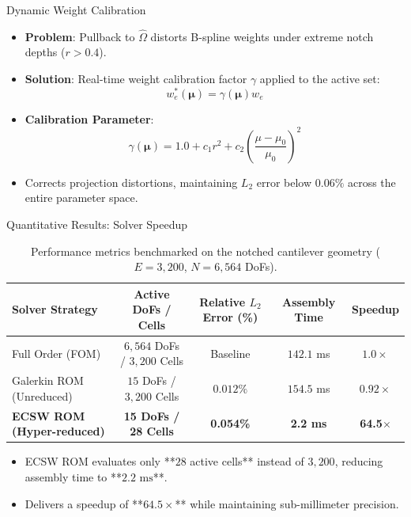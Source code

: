 \documentclass[aspectratio=169, 10pt]{beamer}
\begin{document}
\begin{frame}{Dynamic Weight Calibration}
    \begin{itemize}
        \item \textbf{Problem}: Pullback to $\hat{\Omega}$ distorts B-spline weights under extreme notch depths ($r > 0.4$).
        \item \textbf{Solution}: Real-time weight calibration factor $\gamma$ applied to the active set:
        \begin{equation*}
            w_e^*(\boldsymbol{\mu}) = \gamma(\boldsymbol{\mu}) w_e
        \end{equation*}
        \item \textbf{Calibration Parameter}:
        \begin{equation*}
            \gamma(\boldsymbol{\mu}) = 1.0 + c_1 r^2 + c_2 \left(\frac{\mu - \mu_0}{\mu_0}\right)^2
        \end{equation*}
        \item Corrects projection distortions, maintaining $L_2$ error below $0.06\%$ across the entire parameter space.
    \end{itemize}
\end{frame}

\begin{frame}{Quantitative Results: Solver Speedup}
    \begin{table}
        \centering
        \caption{Performance metrics benchmarked on the notched cantilever geometry ($E = 3,200$, $N = 6,564$ DoFs).}
        \label{tab:performance_results_extended}
        \begin{tabular}{lcccc}
            \toprule
            \textbf{Solver Strategy} & \textbf{Active DoFs / Cells} & \textbf{Relative $L_2$ Error (\%)} & \textbf{Assembly Time} & \textbf{Speedup} \\
            \midrule
            Full Order (FOM)        & $6,564$ DoFs / $3,200$ Cells & Baseline & $142.1$ ms & $1.0\times$ \\
            Galerkin ROM (Unreduced)& $15$ DoFs / $3,200$ Cells    & $0.012\%$   & $154.5$ ms & $0.92\times$ \\
            \textbf{ECSW ROM (Hyper-reduced)}& \textbf{15 DoFs / 28 Cells}  & \textbf{0.054\%} & \textbf{2.2 ms} & \textbf{64.5$\times$} \\
            \bottomrule
        \end{tabular}
    \end{table}
    \begin{itemize}
        \item ECSW ROM evaluates only **$28$ active cells** instead of $3,200$, reducing assembly time to **$2.2\text{ ms}$**.
        \item Delivers a speedup of **$64.5\times$** while maintaining sub-millimeter precision.
    \end{itemize}
\end{frame}
\end{document}

